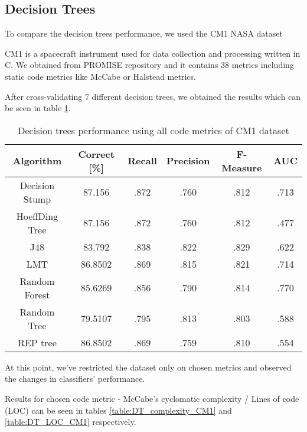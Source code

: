 \subsection{Decision Trees}
To compare the decision trees performance, we used the CM1 NASA dataset

CM1 is a spacecraft instrument used for data collection and processing written in C. We obtained from PROMISE repository and it contains 38 metrics including static code metrics like McCabe or Halstead metrics.

After cross-validating 7 different decision trees, we obtained the results which can be seen in table \ref{table:DT_allMetrics_CM1}.


\begin{table}[h!]
\centering
\begin{tabular}{ |c|c|c|c|c|c| } 
 \hline
 \textbf{Algorithm} & \textbf{Correct [\%]} & \textbf{Recall} & \textbf{Precision} & \textbf{F-Measure} & \textbf{AUC}  \\ 
 \hline
 Decision Stump & \textcolor{myRed}{87.156} & \textcolor{myRed}{.872} & .760 & .812 & .713   \\ 
 \hline
 HoeffDing Tree & \textcolor{myRed}{87.156} & \textcolor{myRed}{.872} & .760 & .812 & .477   \\ 
 \hline
  J48 & 83.792 & .838 & \textcolor{myRed}{.822} & \textcolor{myRed}{.829} & .622   \\ 
 \hline
  LMT & 86.8502 & .869 & .815 & .821 & .714    \\ 
 \hline
  Random Forest & 85.6269 & .856 & .790 & .814 & \textcolor{myRed}{.770}   \\ 
 \hline
  Random Tree & 79.5107 & .795 & .813 & .803 & .588   \\ 
 \hline
 REP tree  & 86.8502 & .869 & .759 & .810 & .554   \\ 
 \hline
\end{tabular}
\caption{Decision trees performance using all code metrics of CM1 dataset}
\label{table:DT_allMetrics_CM1}
\end{table}


At this point, we've restricted the dataset only on chosen metrics and observed the changes  in classifiers' performance.

Results for chosen code metric - McCabe's cyclomatic complexity / Lines of code (LOC) can be seen in tables \ref{table:DT_complexity_CM1} and \ref{table:DT_LOC_CM1} respectively.

